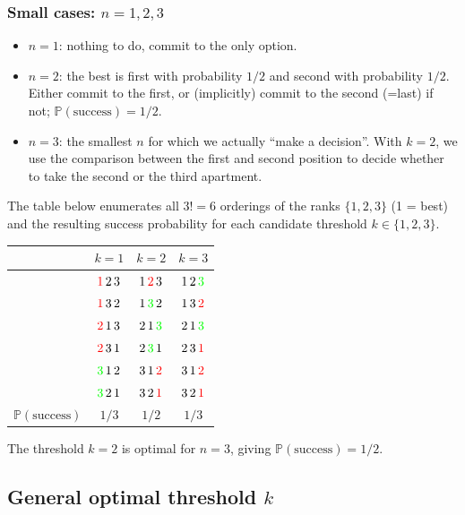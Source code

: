 \subsubsection*{Small cases: $n = 1, 2, 3$}

\begin{itemize}
    \item $n=1$: nothing to do, commit to the only option.
    \item $n=2$: the best is first with probability $1/2$ and second with probability $1/2$. Either commit to the first, or (implicitly) commit to the second (=last) if not; $\mathbb{P}(\text{success}) = 1/2$.
    \item $n=3$: the smallest $n$ for which we actually ``make a decision''. With $k=2$, we use the comparison between the first and second position to decide whether to take the second or the third apartment.
\end{itemize}

The table below enumerates all $3! = 6$ orderings of the ranks $\{1,2,3\}$ (1 = best) and the resulting success probability for each candidate threshold $k \in \{1,2,3\}$.

\begin{center}
\begin{tabular}{c|c|c|c}
 & $k=1$ & $k=2$ & $k=3$ \\
\hline
 &$\textcolor{red}{1}\,2\,3$ & $1\,\textcolor{red}{2}\,3$ & $1\,2\,\textcolor{green}{3}$ & \\ 
 &$\textcolor{red}{1}\,3\,2$ & $1\,\textcolor{green}{3}\,2$ & $1\,3\,\textcolor{red}{2}$ & \\ 
 &$\textcolor{red}{2}\,1\,3$ & $2\,1\,\textcolor{green}{3}$ & $2\,1\,\textcolor{green}{3}$ & \\
 &$\textcolor{red}{2}\,3\,1$ & $2\,\textcolor{green}{3}\,1$ & $2\,3\,\textcolor{red}{1}$ & \\
 &$\textcolor{green}{3}\,1\,2$ & $3\,1\,\textcolor{red}{2}$ & $3\,1\,\textcolor{red}{2}$ & \\
 &$\textcolor{green}{3}\,2\,1$ & $3\,2\,\textcolor{red}{1}$ & $3\,2\,\textcolor{red}{1}$ & \\
\hline
$\mathbb{P}(\text{success})$ & $1/3$ & $1/2$ & $1/3$
\end{tabular}
\end{center}

The threshold $k=2$ is optimal for $n=3$, giving $\mathbb{P}(\text{success}) = 1/2$.

\subsection{General optimal threshold $k$}

